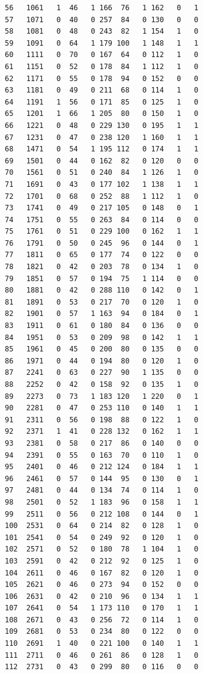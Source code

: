 \documentclass[
  letterpaper,
  DIV=11,
  numbers=noendperiod]{scrreprt}
\begin{document}
\begin{verbatim}
56   1061   1  46   1 166  76   1 162   0   1
57   1071   0  40   0 257  84   0 130   0   0
58   1081   0  48   0 243  82   1 154   1   0
59   1091   0  64   1 179 100   1 148   1   1
60   1111   0  70   0 167  64   0 112   1   0
61   1151   0  52   0 178  84   1 112   1   0
62   1171   0  55   0 178  94   0 152   0   0
63   1181   0  49   0 211  68   0 114   1   0
64   1191   1  56   0 171  85   0 125   1   0
65   1201   1  66   1 205  80   0 150   1   0
66   1221   0  48   0 229 130   0 195   1   1
67   1231   0  47   0 238 120   1 160   1   1
68   1471   0  54   1 195 112   0 174   1   1
69   1501   0  44   0 162  82   0 120   0   0
70   1561   0  51   0 240  84   1 126   1   0
71   1691   0  43   0 177 102   1 138   1   1
72   1701   0  68   0 252  88   1 112   1   0
73   1741   0  49   0 217 105   0 148   0   1
74   1751   0  55   0 263  84   0 114   0   0
75   1761   0  51   0 229 100   0 162   1   1
76   1791   0  50   0 245  96   0 144   0   1
77   1811   0  65   0 177  74   0 122   0   0
78   1821   0  42   0 203  78   0 134   1   0
79   1851   0  57   0 194  75   1 114   0   0
80   1881   0  42   0 288 110   0 142   0   1
81   1891   0  53   0 217  70   0 120   1   0
82   1901   0  57   1 163  94   0 184   0   1
83   1911   0  61   0 180  84   0 136   0   0
84   1951   0  53   0 209  98   0 142   1   1
85   1961   0  45   0 200  80   0 135   0   0
86   1971   0  44   0 194  80   0 120   1   0
87   2241   0  63   0 227  90   1 135   0   0
88   2252   0  42   0 158  92   0 135   1   0
89   2273   0  73   1 183 120   1 220   0   1
90   2281   0  47   0 253 110   0 140   1   1
91   2311   0  56   0 198  88   0 122   1   0
92   2371   1  41   0 228 132   0 162   1   1
93   2381   0  58   0 217  86   0 140   0   0
94   2391   0  55   0 163  70   0 110   1   0
95   2401   0  46   0 212 124   0 184   1   1
96   2461   0  57   0 144  95   0 130   0   1
97   2481   0  44   0 134  74   0 114   1   0
98   2501   0  52   1 183  96   0 158   1   1
99   2511   0  56   0 212 108   0 144   0   1
100  2531   0  64   0 214  82   0 128   1   0
101  2541   0  54   0 249  92   0 120   1   0
102  2571   0  52   0 180  78   1 104   1   0
103  2591   0  42   0 212  92   0 125   1   0
104  2611   0  46   0 167  82   0 120   1   0
105  2621   0  46   0 273  94   0 152   0   0
106  2631   0  42   0 210  96   0 134   1   1
107  2641   0  54   1 173 110   0 170   1   1
108  2671   0  43   0 256  72   0 114   1   0
109  2681   0  53   0 234  80   0 122   0   0
110  2691   1  40   0 221 100   0 140   1   1
111  2711   0  46   0 261  86   0 128   1   0
112  2731   0  43   0 299  80   0 116   0   0

\end{verbatim}
\end{document}
